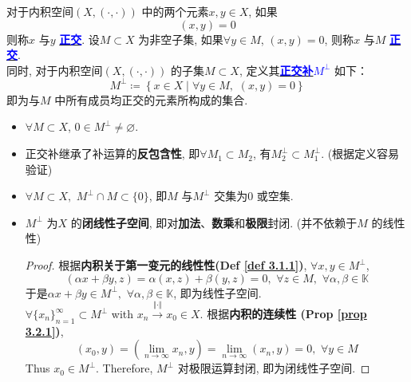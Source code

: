 	\begin{defn}\label{def 3.3.1}
		对于内积空间$(X , (\cdot , \cdot))$ 中的两个元素$x , y \in X$, 如果
		\[ (x , y) = 0 \]
		则称$x$ 与$y$ \underline{\textcolor{blue}{\textbf{正交}}}. 设$M \subset X$ 为非空子集, 如果$\forall y \in M$, $(x , y) = 0$, 则称$x$ 与$M$ \underline{\textcolor{blue}{\textbf{正交}}}. \\
		同时, 对于内积空间$(X , (\cdot , \cdot))$ 的子集$M \subset X$, 定义其\underline{\textcolor{blue}{\textbf{正交补$M^{\perp}$}}} 如下：
		\[ M^{\perp} \coloneqq \left\{ x \in X \mid \forall y \in M , \,\, (x , y) = 0 \right\} \]
		即为与$M$ 中所有成员均正交的元素所构成的集合. 
		
		\vspace{2em}
		
		\begin{rmk}
			\begin{itemize}
				\item $\forall M \subset X$, $0 \in M^{\perp} \neq \varnothing$. 
				
				\vspace{1em}
				
				\item 正交补继承了补运算的\textbf{反包含性}, 即$\forall M_1 \subset M_2$, 有$M_{2}^{\perp} \subset M_{1}^{\perp}$. (根据定义容易验证) 
				
				\vspace{1em}
				
				\item $\forall M \subset X , \,\, M^{\perp} \cap M \subset \{ 0 \}$, 即$M$ 与$M^{\perp}$ 交集为0 或空集. 
				
				\vspace{1em}
				
				\item $M^{\perp}$ 为$X$ 的\textbf{闭线性子空间}, 即对\textbf{加法}、\textbf{数乘}和\textbf{极限}封闭. (并不依赖于$M$ 的线性性)
				
				\vspace{3em}
				
				\begin{proof}
					根据\textbf{内积关于第一变元的线性性(Def \ref{def 3.1.1})}, $\forall x , y \in M^{\perp}$, 
					\[ (\alpha x + \beta y , z) = \alpha (x , z) + \beta (y , z) = 0 , \,\, \forall z \in M , \,\, \forall \alpha , \beta \in \mathbb{K} \]
					于是$\alpha x + \beta y \in M^{\perp} , \,\, \forall \alpha , \beta \in \mathbb{K}$, 即为线性子空间. \\
					$\forall \{ x_n \}_{n = 1}^{\infty} \subset M^{\perp}$ with $x_n \overset{\Vert \cdot \Vert}{\to} x_0 \in X$. 根据\textbf{内积的连续性 (Prop \ref{prop 3.2.1})}, 
					\[ (x_0 , y) 
					= \left( \lim_{n \to \infty} x_n , y \right) 
					= \lim_{n \to \infty} \left( x_n , y \right) 
					= 0 , \,\, \forall y \in M \]
					Thus $x_0 \in M^{\perp}$. Therefore, $M^{\perp}$ 对极限运算封闭, 即为闭线性子空间. 
				\end{proof}
				

\end{itemize}
\end{rmk}
\end{defn}
